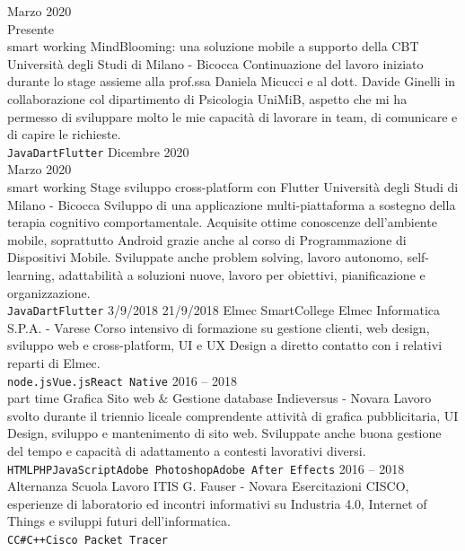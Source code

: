 \documentclass[9pt]{developercv}
\begin{document}
\begin{entrylist}
	\entry
		{Marzo 2020 \\ Presente \\\footnotesize{smart working}}
		{MindBlooming: una soluzione mobile a supporto della CBT}
		{Università degli Studi di Milano - Bicocca}
		{Continuazione del lavoro iniziato durante lo stage assieme alla prof.ssa Daniela Micucci e al dott. Davide Ginelli in collaborazione col dipartimento di Psicologia UniMiB, aspetto che mi ha permesso di sviluppare molto le mie capacità di lavorare in team, di comunicare e di capire le richieste. \\ \texttt{Java}\slashsep\texttt{Dart}\slashsep\texttt{Flutter}}
	\entry
		{Dicembre 2020 \\ Marzo 2020\\\footnotesize{smart working}}
		{Stage sviluppo cross-platform con Flutter}
		{Università degli Studi di Milano - Bicocca}
		{Sviluppo di una applicazione multi-piattaforma a sostegno della terapia cognitivo comportamentale. Acquisite ottime conoscenze dell'ambiente mobile, soprattutto Android grazie anche al corso di Programmazione di Dispositivi Mobile. Sviluppate anche problem solving, lavoro autonomo, self-learning, adattabilità a soluzioni nuove, lavoro per obiettivi, pianificazione e organizzazione. \\ \texttt{Java}\slashsep\texttt{Dart}\slashsep\texttt{Flutter}}
	\entry
		{3/9/2018  21/9/2018}
		{Elmec SmartCollege}
		{Elmec Informatica S.P.A. - Varese}
		{Corso intensivo di formazione su gestione clienti, web design, sviluppo web e cross-platform, UI e UX Design a diretto contatto con i relativi reparti di Elmec. \\ \texttt{node.js}\slashsep\texttt{Vue.js}\slashsep\texttt{React Native}}
	\entry
		{2016 -- 2018\\\footnotesize{part time}}
		{Grafica Sito web \& Gestione database}
		{Indieversus - Novara}
		{Lavoro svolto durante il triennio liceale comprendente attività di grafica pubblicitaria, UI Design, sviluppo e mantenimento di sito web. Sviluppate anche buona gestione del tempo e capacità di adattamento a contesti lavorativi diversi. \\ \texttt{HTML}\slashsep\texttt{PHP}\slashsep\texttt{JavaScript}\slashsep\texttt{Adobe Photoshop}\slashsep\texttt{Adobe After Effects}}
	\entry
		{2016 -- 2018}
		{Alternanza Scuola Lavoro}
		{ITIS G. Fauser - Novara}
		{Esercitazioni CISCO, esperienze di laboratorio ed incontri informativi su Industria 4.0, Internet of Things e sviluppi futuri dell'informatica. \\ \texttt{C}\slashsep\texttt{C\#}\slashsep\texttt{C++}\slashsep\texttt{Cisco Packet Tracer}}
\end{entrylist}
\end{document}
